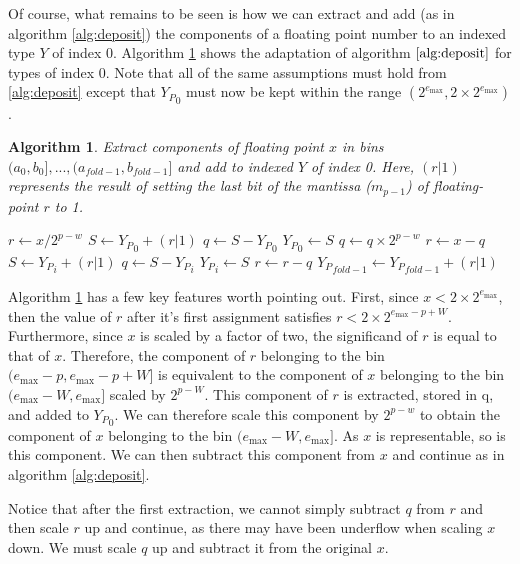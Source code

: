 \documentclass[12pt]{article}
\providecommand{\max}{\ensuremath{\text{max}}}
\theoremstyle{plain}
\newtheorem{alg}{Algorithm}[section]
\begin{document}
      Of course, what remains to be seen is how we can extract and add (as in algorithm \ref{alg:deposit}) the components of a floating point number to an indexed type $Y$ of index 0. Algorithm \ref{alg:deposit0} shows the adaptation of algorithm $\ref{alg:deposit}$ for types of index 0. Note that all of the same assumptions must hold from \ref{alg:deposit} except that ${Y_P}_0$ must now be kept within the range $(2^{e_{\max}}, 2 \times 2^{e_{\max}})$.
      \begin{alg}
        Extract components of floating point $x$ in bins $(a_0, b_0], ..., (a_{fold - 1}, b_{fold - 1}]$ and add to indexed $Y$ of index 0. Here, $(r | 1)$ represents the result of setting the last bit of the mantissa ($m_{p - 1}$) of floating-point $r$ to 1.
        \begin{algorithmic}
            \State $r \gets x / 2^{p - w}$
            \State $S \gets {Y_P}_0 + (r | 1)$
            \State $q \gets S - {Y_P}_0$
            \State ${Y_P}_0 \gets S$
            \State $q \gets q \times 2^{p - w}$
            \State $r \gets x - q$
              \State $S \gets {Y_P}_i + (r | 1)$
              \State $q \gets S - {Y_P}_i$
              \State ${Y_P}_i \gets S$
              \State $r \gets r - q$
            \EndFor
            \State ${Y_P}_{fold - 1} \gets {Y_P}_{fold - 1} + (r | 1)$
          \EndFunction
        \end{algorithmic}
        \label{alg:deposit0}
      \end{alg}

      Algorithm \ref{alg:deposit0} has a few key features worth pointing out. First, since $x < 2 \times 2^{e_{\max}}$, then the value of $r$ after it's first assignment satisfies $r < 2 \times 2^{e_{\max} - p + W}$.
      Furthermore, since $x$ is scaled by a factor of two, the significand of $r$ is equal to that of $x$.
      Therefore, the component of $r$ belonging to the bin $(e_{\max} - p, e_{\max} - p + W]$ is equivalent to the component of $x$ belonging to the bin $(e_{\max} - W, e_{\max}]$ scaled by $2^{p - W}$. This component of $r$ is extracted, stored in q, and added to ${Y_P}_0$. We can therefore scale this component by $2^{p - w}$ to obtain the component of $x$ belonging to the bin $(e_{\max} - W, e_{\max}]$. As $x$ is representable, so is this component. We can then subtract this component from $x$ and continue as in algorithm \ref{alg:deposit}.

      Notice that after the first extraction, we cannot simply subtract $q$ from $r$ and then scale $r$ up and continue, as there may have been underflow when scaling $x$ down. We must scale $q$ up and subtract it from the original $x$.
\end{document}
